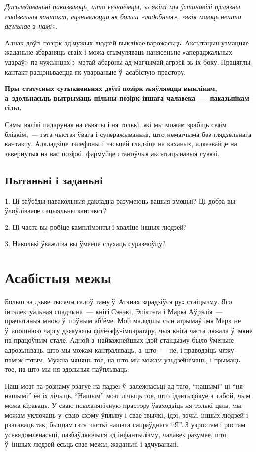 \emph{Дасьледаваньні паказваюць, што незнаёмцы, зь якімі мы ўстанавілі прыязны глядзельны кантакт, ацэньваюцца як больш «падобныя», «якія маюць нешта агульнае з~намі».}

Аднак доўгі позірк ад чужых людзей выклікае варожасьць. Аксытацын узмацняе жаданьне абараняць сваіх і можа стымуляваць нанясеньне «апераджальных удараў» па чужынцах з~мэтай абароны ад магчымай агрэсіі зь іх боку. Працяглы кантакт расцэньваецца як уварваньне ў~асабістую прастору. 

\textbf{Пры статусных сутыкненьнях доўгі позірк зьяўляецца выклікам, а~здольнасьць вытрымаць пільны позірк іншага чалавека~--- паказьнікам сілы.} 

Самы вялікі падарунак на сьвяты і ня толькі, які мы можам зрабіць сваім блізкім,~--- гэта чыстая ўвага і суперажываньне, што немагчыма без глядзельнага кантакту. Адкладзіце тэлефоны і часьцей глядзіце на каханых, адказвайце на зьвернутыя на вас позіркі, фармуйце станоўчыя аксытацынавыя сувязі.

\subsection*{Пытаньні і заданьні}

1. Ці заўсёды навакольныя дакладна разумеюць вашыя эмоцыі? Ці добра вы ўлоўліваеце сацыяльны кантэкст?

2. Ці часта вы робіце камплімэнты і хваліце іншых людзей?

3. Наколькі ўважліва вы ўмееце слухаць суразмоўцу?


\section{Асабістыя межы}

Больш за дзьве тысячы гадоў таму ў~Атэнах зарадзіўся рух стаіцызму. Яго інтэлектуальная спадчына~--- кнігі Сэнэкі, Эпіктэта і Марка Аўрэлія~--- прачытаныя мною ў~поўным аб'ёме. Мой малодшы сын атрымаў імя Марк не ў~апошнюю чаргу дзякуючы філёзафу-імпэратару, чыя кніга часта ляжала ў~мяне на працоўным стале. Адной з~найважнейшых ідэй стаіцызму было ўменьне адрозьніваць, што мы можам кантраляваць, а~што~--- не, і праводзіць мяжу паміж гэтым. Мужна мяняць тое, на што мы можам узьдзейнічаць, і прымаць тое, на што мы ня здольныя паўплываць.

Наш мозг па-рознаму рэагуе на падзеі ў~залежнасьці ад таго, ``нашымі'' ці ``ня нашымі'' ён іх лічыць. ``Нашым'' мозг лічыць тое, што ідэнтыфікуе з~сабой, чым можа кіраваць. У сваю псыхалягічную прастору ўваходзіць ня толькі цела, мы можам уключаць у~сваю схэму ўплыву і свае звычкі, ідэі, рэчы, іншых людзей і рэагаваць так, быццам гэта часткі нашага сапраўднага ``Я''. З узростам і ростам усьвядомленасьці, пазбаўляючыся ад інфантылізму, чалавек разумее, што ў~іншых людзей ёсьць свае межы, жаданьні і адчуваньні. 

